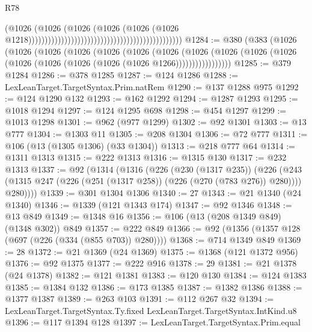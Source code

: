 \begin{lexlean}{R78}
\begin{coremodule}
                                                                                      (@1026
                                                                                        (@1026
                                                                                          (@1026
                                                                                            (@1026
                                                                                              (@1026
                                                                                                (@1026
                                                                                                  @1218)))))))))))))))))))))))))))))))))))))))))))))))
@1284 := @380
    (@383
      (@1026
        (@1026
          (@1026
            (@1026
              (@1026
                (@1026
                  (@1026
                    (@1026
                      (@1026 (@1026 (@1026 (@1026 (@1026 (@1026 (@1026 (@1026 @1266)))))))))))))))))
@1285 := @379 @1284
@1286 := @378 @1285
@1287 := @124 @1286
@1288 := LexLeanTarget.TargetSyntax.Prim.natRem
@1290 := @137 @1288 @975
@1292 := @124 @1290 @132
@1293 := @162 @1292
@1294 := @1287 @1293
@1295 := @1018 @1294
@1297 := @124 @1295 @698
@1298 := @454 @1297
@1299 := @1013 @1298
@1301 := @962 (@977 @1299)
@1302 := @92 @1301
@1303 := @13 @777
@1304 := @1303 @11
@1305 := @208 @1304
@1306 := @72 @777
@1311 := @106 (@13 (@1305 @1306) (@33 @1304))
@1313 := @218 @777 @64
@1314 := @1311 @1313
@1315 := @222 @1313
@1316 := @1315 @130
@1317 := @232 @1313
@1337 := @92
    (@1314
      (@1316
        (@226
          (@230 (@1317 @235))
          (@226
            (@243 (@1315 @247 (@226 (@251 (@1317 @258)) (@226 (@270 (@783 @276)) @280))))
            @280))))
@1339 := @301 @1304 @1306
@1340 := 27
@1343 := @21 @1340 (@24 @1340)
@1346 := @1339 (@121 @1343 @174)
@1347 := @92 @1346
@1348 := @13 @849
@1349 := @1348 @16
@1356 := @106 (@13 (@208 @1349 @849) (@1348 @302)) @849
@1357 := @222 @849
@1366 := @92 (@1356 (@1357 @128 (@697 (@226 (@334 (@855 @703)) @280))))
@1368 := @714 @1349 @849
@1369 := 28
@1372 := @21 @1369 (@24 @1369)
@1375 := @1368 (@121 @1372 @956)
@1376 := @92 @1375
@1377 := @222 @916
@1378 := 29
@1381 := @21 @1378 (@24 @1378)
@1382 := @121 @1381
@1383 := @120 @130
@1384 := @124 @1383
@1385 := @1384 @132
@1386 := @173 @1385
@1387 := @1382 @1386
@1388 := @1377 @1387
@1389 := @263 @103
@1391 := @112 @267 @32
@1394 := LexLeanTarget.TargetSyntax.Ty.fixed LexLeanTarget.TargetSyntax.IntKind.u8
@1396 := @117 @1394 @128
@1397 := LexLeanTarget.TargetSyntax.Prim.equal

\end{coremodule}
\end{lexlean}
